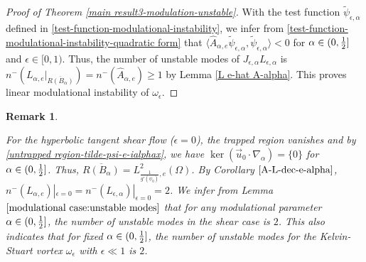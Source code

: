 \documentclass[1 [leqno, 11pt]{amsart}
\numberwithin{equation}{section}
\let\ep=\epsilon
\newtheorem{remark}[Theorem]{Remark}
\begin{document}
\begin{CJK*}{GBK}{song}
\begin{proof}[Proof of Theorem \ref{main result3-modulation-unstable}]
With the test function  $\widetilde\psi_{\ep,\alpha}$ defined in \eqref{test-function-modulational-instability},  we infer from \eqref{test-function-modulational-instability-quadratic form} that
$\langle\hat{A}_{\alpha,e} \widetilde\psi_{\ep,\alpha}, \widetilde\psi_{\ep,\alpha} \rangle<0$ for $\alpha\in(0,{1\over2}]$ and $\ep\in[0,1)$. Thus,
the number of unstable  modes of $J_{\ep,\alpha}L_{\ep,\alpha}$ is $n^-\left( L_{\alpha,e} |_{\overline{R(B_\alpha)}} \right) = n^-\left(\hat{A}_{\alpha,e}\right)\geq1$  by Lemma \ref{L e-hat A-alpha}. This proves  linear modulational instability of $\omega_\ep$.
\end{proof}
\begin{remark} \label{modulational-remark}

For the hyperbolic tangent shear flow ($\ep=0$), the trapped region vanishes and by \eqref{untrapped region-tilde-psi-e-ialphax}, we have $\ker(\vec{u}_0\cdot\nabla_\alpha)=\{0\}$ for $\alpha\in(0,{1\over2}]$. Thus,
 $ {\overline{R(B_\alpha)}}={L^2_{\frac{1}{g'(\psi_0)},e}(\Omega)}$. By Corollary $\ref{A-L-dec-e-alpha}$, $n^-( L_{\alpha,e} )|_{\ep=0}=n^-( L_{\ep,\alpha})|_{\ep=0}=2$. We infer from Lemma $\ref{modulational case:unstable modes}$ that for any modulational parameter $\alpha\in(0,{1\over2}]$, the number of   unstable modes in  the shear case is $2$. This also indicates that for fixed $\alpha\in(0,{1\over2}]$, the number of   unstable modes for the Kelvin-Stuart vortex $\omega_\ep$ with $\ep\ll1$ is $2$.



\end{remark}
\end{CJK*}
\end{document}
